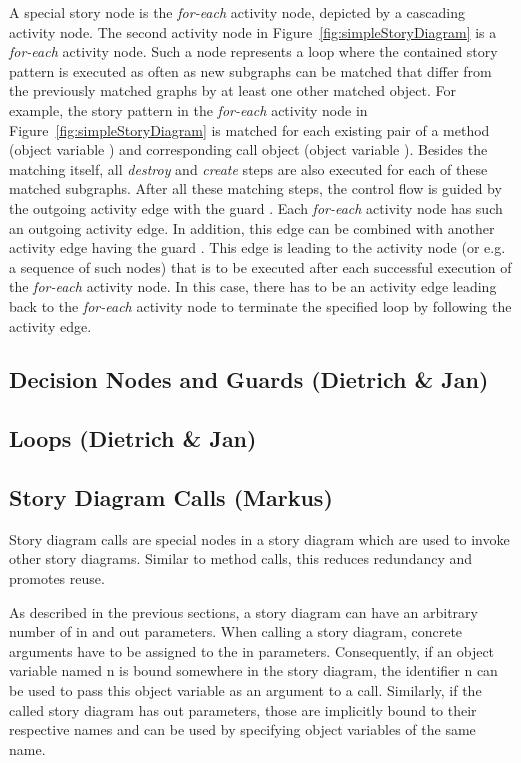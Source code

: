 A special story node is the \emph{for-each} activity node, depicted by a cascading activity node.
The second activity node in Figure~\ref{fig:simpleStoryDiagram} is a \emph{for-each} activity node.
Such a node represents a loop where the contained story pattern is executed as often as new subgraphs can be matched
that differ from the previously matched graphs by at least one other matched object.
For example, the story pattern in the \emph{for-each} activity node in Figure~\ref{fig:simpleStoryDiagram}
is matched for each existing pair of a method (object variable ) and corresponding call object (object variable ).
Besides the matching itself, all \emph{destroy} and \emph{create} steps are also executed for each of these matched subgraphs.
After all these matching steps, the control flow is guided by the outgoing activity edge with the guard .
Each \emph{for-each} activity node has such an outgoing activity edge.
In addition, this edge can be combined with another activity edge having the guard .
This edge is leading to the activity node (or e.g. a sequence of such nodes)
that is to be executed after each successful execution of the \emph{for-each} activity node.
In this case, there has to be an activity edge leading back to the \emph{for-each} activity node
to terminate the specified loop by following the  activity edge.



\subsection{Decision Nodes and Guards (Dietrich \& Jan)}

\subsection{Loops (Dietrich \& Jan)}

\subsection{Story Diagram Calls (Markus)}

Story diagram calls are special nodes in a story diagram which are used to invoke other story diagrams. Similar to method calls, this reduces redundancy and promotes reuse.

As described in the previous sections, a story diagram can have an arbitrary number of in and out parameters. When calling a story diagram, concrete arguments have to be assigned to the in parameters. Consequently, if an object variable named n is bound somewhere in the story diagram, the identifier n can be used to pass this object variable as an argument to a call. Similarly, if the called story diagram has out parameters, those are implicitly bound to their respective names and can be used by specifying object variables of the same name.

